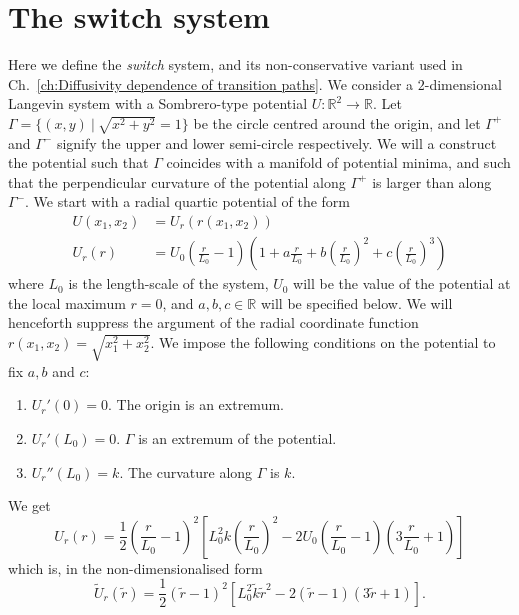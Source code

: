 \documentclass[]{cam-thesis}
\begin{document}
\section{The switch system} \label{app:The switch system}

Here we define the \textit{switch} system, and its non-conservative variant used in Ch.~\ref{ch:Diffusivity dependence of transition paths}. We consider a $2$-dimensional Langevin system with a Sombrero-type potential $U : \mathbb{R}^2 \to \mathbb{R}$. Let $\Gamma=\{(x,y)\ |\ \sqrt{x^2 + y^2} =1\}$ be the circle centred around the origin, and let $\Gamma^{+}$ and
$\Gamma^{-}$ signify the upper and lower semi-circle respectively. We will a construct the potential such that $\Gamma$ coincides with a manifold of potential minima, and such that the perpendicular curvature of the potential along $\Gamma^{+}$ is larger than along $\Gamma^{-}$. We
start with a radial quartic potential of the form 
\begin{align}
U(x_{1},x_{2}) & =U_{r}(r(x_{1},x_{2}))\\
U_{r}(r) & =U_{0}\left(\frac{r}{L_0}-1\right)\left(1+a\frac{r}{L_0}+b\left(\frac{r}{L_0}\right)^{2}+c\left(\frac{r}{L_0}\right)^{3}\right)\nonumber 
\end{align}
where $L_0$ is the length-scale of the system, $U_{0}$ will be the
value of the potential at the local maximum $r=0$, and $a,b,c\in\mathbb{R}$
will be specified below. We will henceforth suppress the argument of
the radial coordinate function $r(x_{1},x_{2})=\sqrt{x_{1}^{2}+x_{2}^{2}}$. We
impose the following conditions on the potential to fix $a, b$ and $c$:
\begin{enumerate}
\item $U_r'(0) = 0$. The origin is an extremum.
\item $U_r'(L_0) = 0$. $\Gamma$ is an extremum of the potential.
\item $U_r''(L_0) = k$. The curvature along $\Gamma$ is $k$.
\end{enumerate}
We get
\begin{equation}
U_{r}(r)=\frac{1}{2}\left(\frac{r}{L_0}-1\right)^{2}\left[L_0^{2} k \left(\frac{r}{L_0}\right)^{2}-2U_{0}\left(\frac{r}{L_0}-1\right)\left(3\frac{r}{L_0}+1\right)\right]
\end{equation}
which is, in the non-dimensionalised form
\begin{equation}
\tilde{U}_{r}(\tilde{r})= \frac{1}{2} 
\left( \tilde{r} -1 \right)^{2} \left[L_0^{2} \tilde{k} \tilde{r}^{2}-2  
\left(\tilde{r}-1\right)\left(3\tilde{r}+1\right)\right].
\end{equation}
\end{document}
